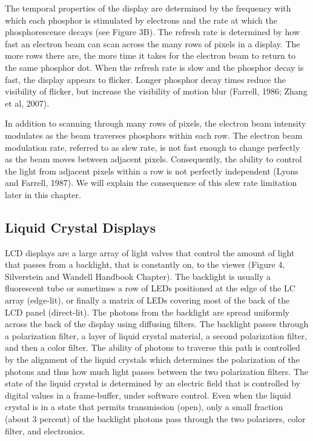 \documentclass[
  letterpaper,
]{book}
\begin{document}
The temporal properties of the display are determined by the frequency
with which each phosphor is stimulated by electrons and the rate at
which the phosphorescence decays (see Figure 3B). The refresh rate is
determined by how fast an electron beam can scan across the many rows of
pixels in a display. The more rows there are, the more time it takes for
the electron beam to return to the same phosphor dot. When the refresh
rate is slow and the phosphor decay is fast, the display appears to
flicker. Longer phosphor decay times reduce the visibility of flicker,
but increase the visibility of motion blur (Farrell, 1986; Zhang et al,
2007).

In addition to scanning through many rows of pixels, the electron beam
intensity modulates as the beam traverses phosphors within each row. The
electron beam modulation rate, referred to as slew rate, is not fast
enough to change perfectly as the beam moves between adjacent pixels.
Consequently, the ability to control the light from adjacent pixels
within a row is not perfectly independent (Lyons and Farrell, 1987). We
will explain the consequence of this slew rate limitation later in this
chapter.

\subsection{\texorpdfstring{\textbf{Liquid Crystal
Displays}}{Liquid Crystal Displays}}\label{liquid-crystal-displays}

LCD displays are a large array of light valves that control the amount
of light that passes from a backlight, that is constantly on, to the
viewer (Figure 4, Silverstein and Wandell Handbook Chapter). The
backlight is usually a fluorescent tube or sometimes a row of LEDs
positioned at the edge of the LC array (edge-lit), or finally a matrix
of LEDs covering most of the back of the LCD panel (direct-lit). The
photons from the backlight are spread uniformly across the back of the
display using diffusing filters. The backlight passes through a
polarization filter, a layer of liquid crystal material, a second
polarization filter, and then a color filter. The ability of photons to
traverse this path is controlled by the alignment of the liquid crystals
which determines the polarization of the photons and thus how much light
passes between the two polarization filters. The state of the liquid
crystal is determined by an electric field that is controlled by digital
values in a frame-buffer, under software control. Even when the liquid
crystal is in a state that permits transmission (open), only a small
fraction (about 3 percent) of the backlight photons pass through the two
polarizers, color filter, and electronics.
\end{document}
